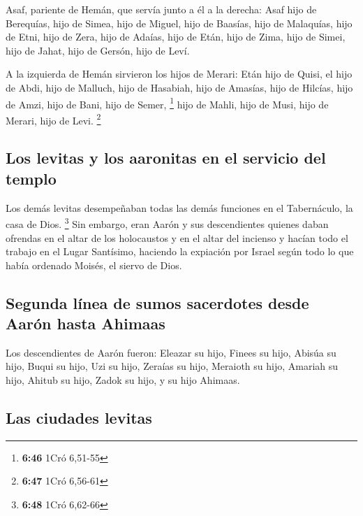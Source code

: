  Asaf, pariente de Hemán, que servía junto a él a la
derecha: Asaf hijo de Berequías, hijo de Simea,  hijo de
Miguel, hijo de Baasías, hijo de Malaquías,  hijo de
Etni, hijo de Zera, hijo de Adaías,  hijo de Etán, hijo
de Zima, hijo de Simei,  hijo de Jahat, hijo de Gersón,
hijo de Leví.

 A la izquierda de Hemán sirvieron los hijos de Merari:
Etán hijo de Quisi, el hijo de Abdi, hijo de Malluch, 
hijo de Hasabiah, hijo de Amasías, hijo de Hilcías,  hijo
de Amzi, hijo de Bani, hijo de Semer, \footnote{\textbf{6:46} 1Cró
  6,51-55}  hijo de Mahli, hijo de Musi, hijo de Merari,
hijo de Levi. \footnote{\textbf{6:47} 1Cró 6,56-61}

\hypertarget{los-levitas-y-los-aaronitas-en-el-servicio-del-templo}{%
\subsection{Los levitas y los aaronitas en el servicio del
templo}\label{los-levitas-y-los-aaronitas-en-el-servicio-del-templo}}

 Los demás levitas desempeñaban todas las demás funciones
en el Tabernáculo, la casa de Dios. \footnote{\textbf{6:48} 1Cró 6,62-66}
 Sin embargo, eran Aarón y sus descendientes quienes
daban ofrendas en el altar de los holocaustos y en el altar del incienso
y hacían todo el trabajo en el Lugar Santísimo, haciendo la expiación
por Israel según todo lo que había ordenado Moisés, el siervo de Dios.

\hypertarget{segunda-luxednea-de-sumos-sacerdotes-desde-aaruxf3n-hasta-ahimaas}{%
\subsection{Segunda línea de sumos sacerdotes desde Aarón hasta
Ahimaas}\label{segunda-luxednea-de-sumos-sacerdotes-desde-aaruxf3n-hasta-ahimaas}}

 Los descendientes de Aarón fueron: Eleazar su hijo,
Finees su hijo, Abisúa su hijo,  Buqui su hijo, Uzi su
hijo, Zeraías su hijo,  Meraioth su hijo, Amariah su
hijo, Ahitub su hijo,  Zadok su hijo, y su hijo Ahimaas.

\hypertarget{las-ciudades-levitas}{%
\subsection{Las ciudades levitas}\label{las-ciudades-levitas}}

